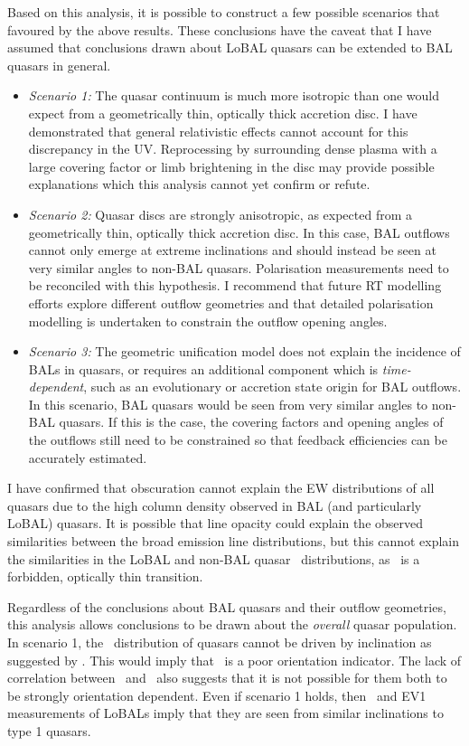 Based on this analysis, it is possible to construct a few possible scenarios 
that favoured by the above results. These conclusions have the caveat that I 
have assumed that conclusions drawn about LoBAL quasars can be extended to BAL 
quasars in general.
\begin{itemize}
	\item {\sl Scenario 1:} The quasar continuum is much more isotropic than one would
	expect from a geometrically thin, optically thick accretion disc.
    I have demonstrated that general relativistic effects cannot account for this discrepancy in the 
    UV. Reprocessing by surrounding dense plasma with a large covering factor or limb brightening 
    in the disc may provide possible explanations which this analysis cannot yet confirm or refute.
    \smallskip
	\item {\sl Scenario 2:} Quasar discs are strongly anisotropic, as expected from a 
	geometrically thin, optically thick accretion disc. In this case, BAL outflows cannot 
	only emerge at extreme inclinations and should instead be seen at very similar angles
	to non-BAL quasars. Polarisation measurements need to be reconciled with this hypothesis.
	I recommend that future RT modelling efforts explore different outflow 
	geometries and that detailed polarisation modelling is undertaken to constrain the 
	outflow opening angles.
	\smallskip
	\item  {\sl Scenario 3:} The geometric unification model does not explain the incidence of 
	BALs in quasars, or requires an additional component which is {\em time-dependent}, 
	such as an evolutionary or accretion state origin for BAL outflows. In this scenario, 
	BAL quasars would be seen from very similar angles to non-BAL quasars. If this is the case,
	the covering factors and opening angles of the outflows still need to be constrained so
	that feedback efficiencies can be accurately estimated.
\end{itemize}
I have confirmed that obscuration cannot explain the EW distributions of all quasars
due to the high column density observed in BAL (and particularly LoBAL) quasars. It is
possible that line opacity could explain the observed similarities between the broad emission
line distributions, but this cannot explain the similarities in the LoBAL and non-BAL
quasar \ewo\ distributions, as \oiii\ is a forbidden, optically thin transition.

Regardless of the conclusions about BAL quasars and their outflow geometries,
this analysis allows conclusions to be drawn about the {\em overall} 
quasar population. In scenario 1, the \ewo\ distribution of quasars cannot
be driven by inclination as suggested by \citep{risaliti2011}. This would
imply that \ewo\ is a poor orientation indicator. The lack of correlation 
between \ewo\ and \fwh\ also suggests that it is not possible for them both
to be strongly orientation dependent. Even if scenario 1 holds, then \fwh\ and EV1
measurements of LoBALs imply that they are seen from similar inclinations to type 1 quasars. 

